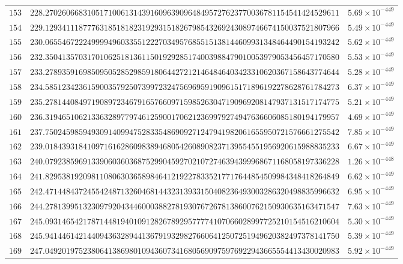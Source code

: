 \documentclass[12pt,reqno]{amsart}
\theoremstyle{plain}
\theoremstyle{definition}
\theoremstyle{remark}
\begin{document}
\begin{longtable}{clc}
$153$ & $228.2702606683105171006131439160963909648495727623770036781154541424529611$ & $5.69 \times 10^{-449}$ \\
$154$ & $229.1293411187776318518182319293151826798543269243089746674150037521807966$ & $5.49 \times 10^{-449}$ \\
$155$ & $230.0655467222499994960335512227034957685515138144609931348464490154193242$ & $5.62 \times 10^{-449}$ \\
$156$ & $232.3504135703170106251813611501929285174003988479010053979053456457170580$ & $5.53 \times 10^{-449}$ \\
$157$ & $233.2789359169850950528529859180644272121464846403423310620367158643774644$ & $5.28 \times 10^{-449}$ \\
$158$ & $234.5851234236159003579250739972324756969591909615171896192278628761784273$ & $6.37 \times 10^{-449}$ \\
$159$ & $235.2781440849719089723467916576609715985263047190969208147937131517174775$ & $5.21 \times 10^{-449}$ \\
$160$ & $236.3194651062133632897797461259001706212369979274947636606085180194179957$ & $4.69 \times 10^{-449}$ \\
$161$ & $237.7502459859493091409947528335486909271247941982061655950721576661275542$ & $7.85 \times 10^{-449}$ \\
$162$ & $239.0184393184109716162860983894680542608908237139554551956920615988835233$ & $6.67 \times 10^{-449}$ \\
$163$ & $240.0792385969133906036036875299045927021072746394399968671168058197336228$ & $1.26 \times 10^{-448}$ \\
$164$ & $241.8295381920981108063036589846412192278335217717644854509984348418264849$ & $6.62 \times 10^{-449}$ \\
$165$ & $242.4714484372455424871326046814432313933150408236493003286320498835996632$ & $6.95 \times 10^{-449}$ \\
$166$ & $244.2781399513230979204344600038827819307672678138600762150930635163471547$ & $7.63 \times 10^{-449}$ \\
$167$ & $245.0931465421787144819401091282678929577774107066028997725210154516210604$ & $5.30 \times 10^{-449}$ \\
$168$ & $245.9414461421440943632894413679193298276606412507251949620382497378141750$ & $5.39 \times 10^{-449}$ \\
$169$ & $247.0492019752380641386980109436073416805690975976922943665554413430020983$ & $5.92 \times 10^{-449}$ \\

\end{longtable}
\end{document}
